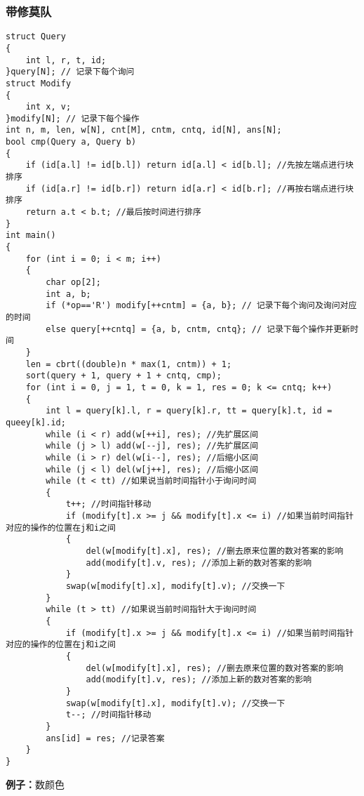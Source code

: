 \documentclass[a4paper, fontset=none]{ctexart}
\begin{document}
\subsubsection{带修莫队}
\begin{verbatim}
struct Query
{
    int l, r, t, id;
}query[N]; // 记录下每个询问
struct Modify
{
    int x, v;
}modify[N]; // 记录下每个操作
int n, m, len, w[N], cnt[M], cntm, cntq, id[N], ans[N];
bool cmp(Query a, Query b)
{
    if (id[a.l] != id[b.l]) return id[a.l] < id[b.l]; //先按左端点进行块排序
    if (id[a.r] != id[b.r]) return id[a.r] < id[b.r]; //再按右端点进行块排序
    return a.t < b.t; //最后按时间进行排序
}
int main()
{
    for (int i = 0; i < m; i++)
    {
        char op[2];
        int a, b;
        if (*op=='R') modify[++cntm] = {a, b}; // 记录下每个询问及询问对应的时间
        else query[++cntq] = {a, b, cntm, cntq}; // 记录下每个操作并更新时间
    }
    len = cbrt((double)n * max(1, cntm)) + 1;
    sort(query + 1, query + 1 + cntq, cmp);
    for (int i = 0, j = 1, t = 0, k = 1, res = 0; k <= cntq; k++)
    {
        int l = query[k].l, r = query[k].r, tt = query[k].t, id = queey[k].id;
        while (i < r) add(w[++i], res); //先扩展区间
        while (j > l) add(w[--j], res); //先扩展区间
        while (i > r) del(w[i--], res); //后缩小区间
        while (j < l) del(w[j++], res); //后缩小区间
        while (t < tt) //如果说当前时间指针小于询问时间
        {
            t++; //时间指针移动
            if (modify[t].x >= j && modify[t].x <= i) //如果当前时间指针对应的操作的位置在j和i之间
            {
                del(w[modify[t].x], res); //删去原来位置的数对答案的影响
                add(modify[t].v, res); //添加上新的数对答案的影响
            }
            swap(w[modify[t].x], modify[t].v); //交换一下
        }
        while (t > tt) //如果说当前时间指针大于询问时间
        {
            if (modify[t].x >= j && modify[t].x <= i) //如果当前时间指针对应的操作的位置在j和i之间
            {
                del(w[modify[t].x], res); //删去原来位置的数对答案的影响
                add(modify[t].v, res); //添加上新的数对答案的影响
            }
            swap(w[modify[t].x], modify[t].v); //交换一下
            t--; //时间指针移动
        }
        ans[id] = res; //记录答案
    }
}
\end{verbatim}
\textbf{例子：}数颜色
\end{document}
